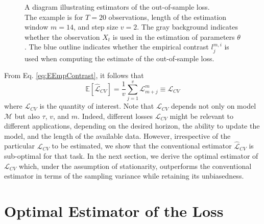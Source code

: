 \documentclass[11pt,dvipsnames]{article}
\begin{document}
\begin{figure}[!htb]
\endminipage
    \caption{
    A diagram illustrating estimators of the out-of-sample loss.\\ 
    The example is for $ T=20 $ observations, length of the estimation window $ m=14 $, and step size $ v=2 $. The gray background indicates whether the observation $ X_{t} $ is used in the estimation of parameters $ \theta $. The blue outline indicates whether the empirical contrast $  l_{j}^{m,i}$ is used when computing the estimate of the out-of-sample loss.
    }
\end{figure}


From Eq. \ref{eq:EEmpContrast}, it follows that 
\begin{equation}
\mathbb{E}\left[ \widehat{\mathcal{L}}_{CV}\right]=\dfrac{1}{v}\sum_{j=1}^{v} \mathcal{L}_{m+j}^{m}\equiv \mathcal{L}_{CV}
\end{equation} 
where $ \mathcal{L}_{CV} $ is the quantity of interest. Note that $ \mathcal{L}_{CV} $ depends not only on model $ \mathcal{M}  $ but also $ \tau $, $ v $, and $ m $. Indeed, different losses $ \mathcal{L}_{CV} $ might be relevant to different applications, depending on the desired horizon, the ability to update the model, and the length of the available data. However, irrespective of the particular $ \mathcal{L}_{CV} $ to be estimated, we show that the conventional estimator $ \widehat{\mathcal{L}}_{CV} $ is sub-optimal for that task. In the next section, we derive the optimal estimator of $ \mathcal{L}_{CV} $ which, under the assumption of stationarity, outperforms the conventional estimator in terms of the sampling variance while retaining its unbiasedness.

\section{Optimal Estimator of the Loss}\label{Estimator}
\end{document}

